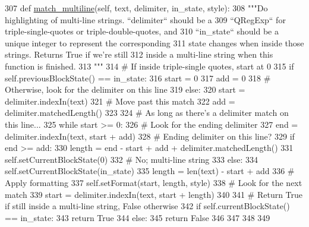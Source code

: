 \begin{DoxyCode}
307     \textcolor{keyword}{def }\hyperlink{classsoftware_1_1chipwhisperer_1_1common_1_1ui_1_1ProjectTextEditor_1_1ProjectHighlighter_a993aa7678b330cf6bc69f3f273ef591c}{match\_multiline}(self, text, delimiter, in\_state, style):
308         \textcolor{stringliteral}{"""Do highlighting of multi-line strings. ``delimiter`` should be a}
309 \textcolor{stringliteral}{        ``QRegExp`` for triple-single-quotes or triple-double-quotes, and}
310 \textcolor{stringliteral}{        ``in\_state`` should be a unique integer to represent the corresponding}
311 \textcolor{stringliteral}{        state changes when inside those strings. Returns True if we're still}
312 \textcolor{stringliteral}{        inside a multi-line string when this function is finished.}
313 \textcolor{stringliteral}{        """}
314         \textcolor{comment}{# If inside triple-single quotes, start at 0}
315         \textcolor{keywordflow}{if} self.previousBlockState() == in\_state:
316             start = 0
317             add = 0
318         \textcolor{comment}{# Otherwise, look for the delimiter on this line}
319         \textcolor{keywordflow}{else}:
320             start = delimiter.indexIn(text)
321             \textcolor{comment}{# Move past this match}
322             add = delimiter.matchedLength()
323 
324         \textcolor{comment}{# As long as there's a delimiter match on this line...}
325         \textcolor{keywordflow}{while} start >= 0:
326             \textcolor{comment}{# Look for the ending delimiter}
327             end = delimiter.indexIn(text, start + add)
328             \textcolor{comment}{# Ending delimiter on this line?}
329             \textcolor{keywordflow}{if} end >= add:
330                 length = end - start + add + delimiter.matchedLength()
331                 self.setCurrentBlockState(0)
332             \textcolor{comment}{# No; multi-line string}
333             \textcolor{keywordflow}{else}:
334                 self.setCurrentBlockState(in\_state)
335                 length = len(text) - start + add
336             \textcolor{comment}{# Apply formatting}
337             self.setFormat(start, length, style)
338             \textcolor{comment}{# Look for the next match}
339             start = delimiter.indexIn(text, start + length)
340 
341         \textcolor{comment}{# Return True if still inside a multi-line string, False otherwise}
342         \textcolor{keywordflow}{if} self.currentBlockState() == in\_state:
343             \textcolor{keywordflow}{return} \textcolor{keyword}{True}
344         \textcolor{keywordflow}{else}:
345             \textcolor{keywordflow}{return} \textcolor{keyword}{False}
346 
347 
348 
349 \end{DoxyCode}


